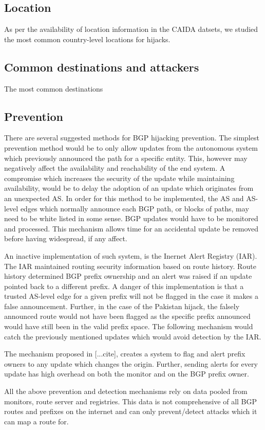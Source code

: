 \subsection{Location}
As per the availability of location information in the CAIDA datsets, we studied the most common country-level locations for hijacks. 
\subsection{Common destinations and attackers}
The most common destinations 
 \subsection{Prevention}
 There are several suggested methods for BGP hijacking prevention. The simplest prevention method would be to only allow updates from the autonomous system which previously announced the path for a specific entity. This, however may negatively affect the availability and reachability of the end system. A compromise which increases the security of the update while maintaining availability, would be to delay the adoption of an update which originates from an unexpected AS. In order for this method to be implemented, the AS and AS-level edges which normally announce each BGP path, or blocks of paths, may need to be white listed in some sense. BGP updates would have to be monitored and processed. This mechanism allows time for an accidental update be removed before having widespread, if any affect. 
 
An inactive implementation of such system, is the Inernet Alert Registry (IAR). The IAR  maintained routing security information based on route history. Route history determined BGP prefix ownership and an alert was raised if an update pointed back to a different prefix. A danger of this implementation is that a trusted AS-level edge for a given prefix will not be flagged in the case it makes a false announcement. Further, in the case of the Pakistan hijack, the falsely announced route would not have been flagged as the specific prefix announced would have still been in the valid prefix space. The following mechanism would catch the previously mentioned updates which would avoid detection by the IAR.

The mechanism proposed in [...cite], creates a system to flag and alert prefix owners to any update which changes the origin. Further, sending alerts for every update has high overhead on both the monitor and on the BGP prefix owner.  

All the above prevention and detection mechanisms rely on data pooled from monitors, route server and registries. This data is not comprehensive of all BGP routes and prefixes on the internet and can only prevent/detect attacks which it can map a route for.
 
 